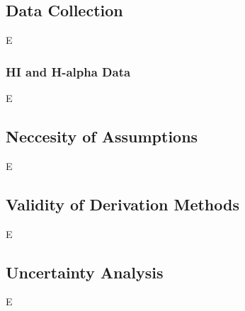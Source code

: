 \subsection{Data Collection}
\label{ssec:B1}

E

\subsubsection{HI and H-alpha Data}
\label{sssec:B1}

E

\subsection{Neccesity of Assumptions}
\label{ssec:B2}

E

\subsection{Validity of Derivation Methods}
\label{ssec:B3}

E

\subsection{Uncertainty Analysis}
\label{ssec:B4}

E
